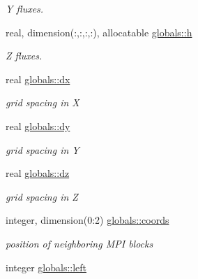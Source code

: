 \begin{DoxyCompactItemize}
\begin{DoxyCompactList}\small\item\em Y fluxes. \end{DoxyCompactList}\item 
\hypertarget{namespaceglobals_af6262d058b86075848725c846e7cc9cc}{}real, dimension(\+:,\+:,\+:,\+:), allocatable \hyperlink{namespaceglobals_af6262d058b86075848725c846e7cc9cc}{globals\+::h}\label{namespaceglobals_af6262d058b86075848725c846e7cc9cc}

\begin{DoxyCompactList}\small\item\em Z fluxes. \end{DoxyCompactList}\item 
\hypertarget{namespaceglobals_aafee650389fdf595e41e37cb340155ae}{}real \hyperlink{namespaceglobals_aafee650389fdf595e41e37cb340155ae}{globals\+::dx}\label{namespaceglobals_aafee650389fdf595e41e37cb340155ae}

\begin{DoxyCompactList}\small\item\em grid spacing in X \end{DoxyCompactList}\item 
\hypertarget{namespaceglobals_a9b12323045a0672fe06f9b7091cd3e7a}{}real \hyperlink{namespaceglobals_a9b12323045a0672fe06f9b7091cd3e7a}{globals\+::dy}\label{namespaceglobals_a9b12323045a0672fe06f9b7091cd3e7a}

\begin{DoxyCompactList}\small\item\em grid spacing in Y \end{DoxyCompactList}\item 
\hypertarget{namespaceglobals_a81293f145f1af171eb88b6feced78c95}{}real \hyperlink{namespaceglobals_a81293f145f1af171eb88b6feced78c95}{globals\+::dz}\label{namespaceglobals_a81293f145f1af171eb88b6feced78c95}

\begin{DoxyCompactList}\small\item\em grid spacing in Z \end{DoxyCompactList}\item 
\hypertarget{namespaceglobals_a8d38eca539ad2b24a66616e42b79ac4c}{}integer, dimension(0\+:2) \hyperlink{namespaceglobals_a8d38eca539ad2b24a66616e42b79ac4c}{globals\+::coords}\label{namespaceglobals_a8d38eca539ad2b24a66616e42b79ac4c}

\begin{DoxyCompactList}\small\item\em position of neighboring M\+P\+I blocks \end{DoxyCompactList}\item 
\hypertarget{namespaceglobals_aba9a16c1b0ed3e52dce83157476d099c}{}integer \hyperlink{namespaceglobals_aba9a16c1b0ed3e52dce83157476d099c}{globals\+::left}\label{namespaceglobals_aba9a16c1b0ed3e52dce83157476d099c}


\end{DoxyCompactItemize}
